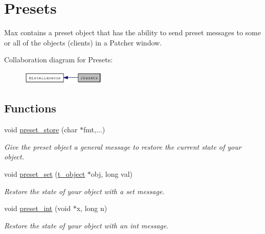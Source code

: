 \hypertarget{group__presets}{
\section{Presets}
\label{group__presets}
}


Max contains a preset object that has the ability to send preset messages to some or all of the objects (clients) in a Patcher window.  


Collaboration diagram for Presets:\nopagebreak
\begin{figure}[H]
\begin{center}
\leavevmode
\includegraphics[width=113pt]{group__presets}
\end{center}
\end{figure}
\subsection*{Functions}
\begin{DoxyCompactItemize}
\item 
void \hyperlink{group__presets_ga5f6d86fdc24e371604b764e7581a4fcb}{preset\_\-store} (char $\ast$fmt,...)
\begin{DoxyCompactList}\small\item\em Give the preset object a general message to restore the current state of your object. \item\end{DoxyCompactList}\item 
void \hyperlink{group__presets_ga178edd4c9abaecc58ca6379cf2547298}{preset\_\-set} (\hyperlink{structt__object}{t\_\-object} $\ast$obj, long val)
\begin{DoxyCompactList}\small\item\em Restore the state of your object with a set message. \item\end{DoxyCompactList}\item 
void \hyperlink{group__presets_gaf1da6073fef8e3f896602cf7f9738a23}{preset\_\-int} (void $\ast$x, long n)
\begin{DoxyCompactList}\small\item\em Restore the state of your object with an int message. \item\end{DoxyCompactList}\end{DoxyCompactItemize}



